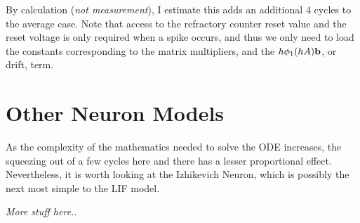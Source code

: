 By calculation ({\em not measurement}), I estimate this adds an
additional $4$ cycles to the average case. Note that access to the
refractory counter reset value and the reset voltage is only required
when a spike occurs, and thus we only need to load the constants
corresponding to the matrix multipliers, and the
$h\phi_1(h A)\mbox{\bf b}$, or drift, term.

\section{Other Neuron Models}

As the complexity of the mathematics needed to solve the ODE
increases, the squeezing out of a few cycles here and there has a
lesser proportional effect. Nevertheless, it is worth looking at the
Izhikevich Neuron, which is possibly the next most simple to the LIF
model.

{\em More stuff here..}
